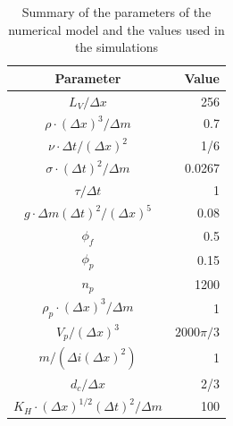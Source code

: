
\begin{table}
\centering
\caption{Summary of the parameters of the numerical model and the values used in the simulations}
\label{tab:parameters}
\begin{tabular}{|c|r|}
\hline
Parameter & Value \\
\hline
$L_V/\Delta x$ & 256 \\
$\rho \cdot (\Delta x)^3/\Delta m$ & 0.7 \\
$\nu \cdot \Delta t/(\Delta x)^2$ & 1/6 \\
$\sigma \cdot (\Delta t)^2/\Delta m$ & 0.0267 \\
$\tau/\Delta t$ & 1 \\
$g \cdot \Delta m(\Delta t)^2/(\Delta x)^5$ & 0.08 \\
$\phi_f$ & 0.5 \\
$\phi_p$ & 0.15 \\
$n_p$ & 1200 \\
$\rho_p \cdot (\Delta x)^3/\Delta m$ & 1 \\
$V_p/(\Delta x)^3$ & $2000\pi/3$ \\
$m/(\Delta i(\Delta x)^2)$ & 1 \\
$d_c/\Delta x$ & 2/3 \\
$K_H\cdot (\Delta x)^{1/2}(\Delta t)^2/\Delta m$ & 100 \\
\hline
\end{tabular}
\end{table}

